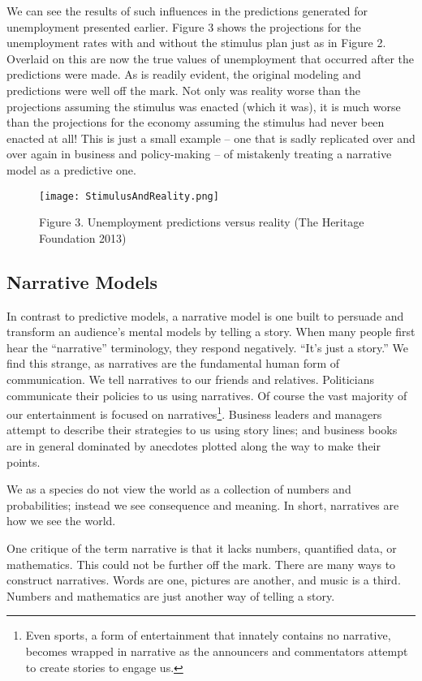 \documentclass[]{memoir}
\let\Oldincludegraphics\includegraphics
\renewcommand{\includegraphics}[1]{\Oldincludegraphics[max size={\textwidth}{\textheight}]{#1}}
\begin{document}
We can see the results of such influences in the predictions generated
for unemployment presented earlier. Figure 3 shows the projections for
the unemployment rates with and without the stimulus plan just as in
Figure 2. Overlaid on this are now the true values of unemployment that
occurred after the predictions were made. As is readily evident, the
original modeling and predictions were well off the mark. Not only was
reality worse than the projections assuming the stimulus was enacted
(which it was), it is much worse than the projections for the economy
assuming the stimulus had never been enacted at all! This is just a
small example -- one that is sadly replicated over and over again in
business and policy-making -- of mistakenly treating a narrative model
as a predictive one.

\begin{figure}[htbp]
\centering
\texttt{[image: StimulusAndReality.png]}
\caption{Figure 3. Unemployment predictions versus reality (The Heritage
Foundation 2013)}
\end{figure}

\subsection{Narrative Models}

In contrast to predictive models, a narrative model is one built to
persuade and transform an audience's mental models by telling a story.
When many people first hear the ``narrative'' terminology, they respond
negatively. ``It's just a story.'' We find this strange, as narratives
are the fundamental human form of communication. We tell narratives to
our friends and relatives. Politicians communicate their policies to us
using narratives. Of course the vast majority of our entertainment is
focused on narratives\footnote{Even sports, a form of entertainment that
  innately contains no narrative, becomes wrapped in narrative as the
  announcers and commentators attempt to create stories to engage us.}.
Business leaders and managers attempt to describe their strategies to us
using story lines; and business books are in general dominated by
anecdotes plotted along the way to make their points.

We as a species do not view the world as a collection of numbers and
probabilities; instead we see consequence and meaning. In short,
narratives are how we see the world.

One critique of the term narrative is that it lacks numbers, quantified
data, or mathematics. This could not be further off the mark. There are
many ways to construct narratives. Words are one, pictures are another,
and music is a third. Numbers and mathematics are just another way of
telling a story.
\end{document}
